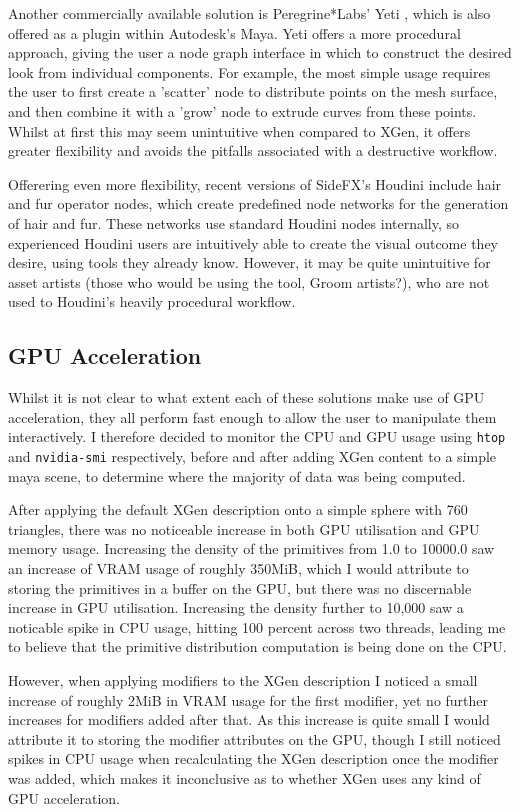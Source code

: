 \documentclass[]{acmsiggraph}
\begin{document}
Another commercially available solution is Peregrine*Labs' Yeti \cite{yeti}, which is also offered as a plugin within Autodesk's Maya. Yeti offers a more procedural approach, giving the user a node graph interface in which to construct the desired look from individual components. For example, the most simple usage requires the user to first create a 'scatter' node to distribute points on the mesh surface, and then combine it with a 'grow' node to extrude curves from these points. Whilst at first this may seem unintuitive when compared to XGen, it offers greater flexibility and avoids the pitfalls associated with a destructive workflow.

Offerering even more flexibility, recent versions of SideFX's Houdini include hair and fur operator nodes, which create predefined node networks for the generation of hair and fur. These networks use standard Houdini nodes internally, so experienced Houdini users are intuitively able to create the visual outcome they desire, using tools they already know. However, it may be quite unintuitive for asset artists (those who would be using the tool, Groom artists?), who are not used to Houdini's heavily procedural workflow.

\subsection{GPU Acceleration} \label{sec:existingGPU}
Whilst it is not clear to what extent each of these solutions make use of GPU acceleration, they all perform fast enough to allow the user to manipulate them interactively. I therefore decided to monitor the CPU and GPU usage using \verb|htop| and \verb|nvidia-smi| respectively, before and after adding XGen content to a simple maya scene, to determine where the majority of data was being computed.

After applying the default XGen description onto a simple sphere with 760 triangles, there was no noticeable increase in both GPU utilisation and GPU memory usage. Increasing the density of the primitives from 1.0 to 10000.0 saw an increase of VRAM usage of roughly 350MiB, which I would attribute to storing the primitives in a buffer on the GPU, but there was no discernable increase in GPU utilisation. Increasing the density further to 10,000 saw a noticable spike in CPU usage, hitting 100 percent across two threads, leading me to believe that the primitive distribution computation is being done on the CPU.

However, when applying modifiers to the XGen description I noticed a small increase of roughly 2MiB in VRAM usage for the first modifier, yet no further increases for modifiers added after that. As this increase is quite small I would attribute it to storing the modifier attributes on the GPU, though I still noticed spikes in CPU usage when recalculating the XGen description once the modifier was added, which makes it inconclusive as to whether XGen uses any kind of GPU acceleration.
\end{document}
